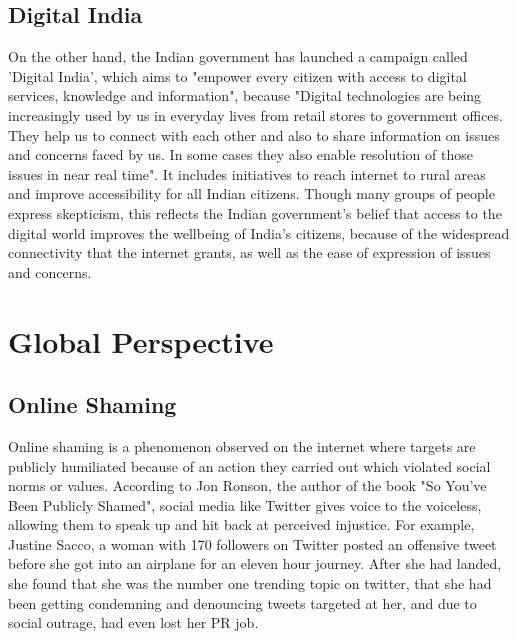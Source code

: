 \documentclass[a4paper, 11pt]{article}
\begin{document}
\subsection{Digital India}
\label{digital-india}
On the other hand, the Indian government has launched a campaign called 'Digital India', which aims to "empower every citizen with access to digital services, knowledge and information", because "Digital technologies are being increasingly used by us in everyday lives from retail stores to government offices. They help us to connect with each other and also to share information on issues and concerns faced by us. In some cases they also enable resolution of those issues in near real time".\cite{digital-india-gov} It includes initiatives to reach internet to rural areas and improve accessibility for all Indian citizens. Though many groups of people express skepticism, this reflects the Indian government's belief that access to the digital world improves the wellbeing of India's citizens, because of the widespread connectivity that the internet grants, as well as the ease of expression of issues and concerns. \cite{digital-india-thehindu, digital-india-thehindu-2}

\section{Global Perspective}

\subsection{Online Shaming}

Online shaming is a phenomenon observed on the internet where targets are publicly humiliated because of an action they carried out which violated social norms or values. According to Jon Ronson, the author of the book "So You've Been Publicly Shamed", social media like Twitter gives voice to the voiceless, allowing them to speak up and hit back at perceived injustice. \cite{jon-ronson-book, jon-ronson-ted-talk} For example, Justine Sacco, a woman with 170 followers on Twitter posted an offensive tweet before she got into an airplane for an eleven hour journey. After she had landed, she found that she was the number one trending topic on twitter, that she had been getting condemning and denouncing tweets targeted at her, and due to social outrage, had even lost her PR job.
\end{document}
